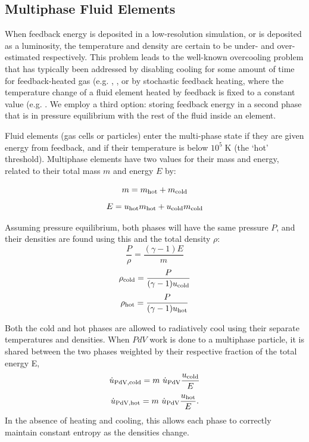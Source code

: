 \subsection{Multiphase Fluid Elements}
When feedback energy is deposited in a low-resolution simulation, or is
deposited as a luminosity, the temperature and density are certain to be under-
and over-estimated respectively.  This problem leads to the well-known
overcooling problem that has typically been addressed by disabling
cooling for some amount of time for feedback-heated gas (e.g.
\citet{Stinson2006}, \citet{Springel2003}, or by stochastic feedback heating,
where the temperature change of a fluid element heated by feedback is fixed to a
constant value (e.g.  \citet{DallaVecchia2012}.  We employ a third option:
storing feedback energy in a second phase that is in pressure equilibrium with
the rest of the fluid inside an element.

Fluid elements (gas cells or particles) enter the multi-phase state if they are
given energy from feedback, and if their temperature is below $10^5\;\mathrm{K}$
(the `hot' threshold).  Multiphase elements have two values for their mass and
energy, related to their total mass $m$ and energy $E$ by:

\begin{equation}\label{multiphase_fractions1}
    m = m_{\rm hot}+m_{\rm cold}
\end{equation}
\begin{equation}
    E = u_{\rm hot}m_{\rm hot}+u_{\rm cold}m_{\rm cold}
\end{equation}

Assuming pressure equilibrium, both phases will have the same pressure $P$, and
their densities are found using this and the total density $\rho$:
\begin{equation}\label{multiphase_pressurebalance1}
    \frac{P}{\rho} = \frac{(\gamma-1)E}{m}
\end{equation}
\begin{equation}\label{multiphase_densities1}
    \rho_{\rm cold} = \frac{P}{(\gamma-1)u_{\rm cold}}
\end{equation}
\begin{equation}
    \rho_{\rm hot} = \frac{P}{(\gamma-1)u_{\rm hot}}
\end{equation}

Both the cold and hot phases are allowed to radiatively cool using their
separate temperatures and densities.   When $PdV$ work is done to a multiphase
particle, it is shared between the two phases weighted by their respective
fraction of the total energy E,
\begin{equation}\label{multiphase_PdV1}
    \dot u_{\rm PdV,cold} = m\ \dot u_{\rm PdV}\frac{u_{\rm cold}}{E}\\
\end{equation}
\begin{equation}
    \dot u_{\rm PdV,hot} = m\ \dot u_{\rm PdV}\frac{u_{\rm hot}}{E}.
\end{equation}
In the absence of heating and cooling, this allows each phase to correctly
maintain constant entropy as the densities change.

